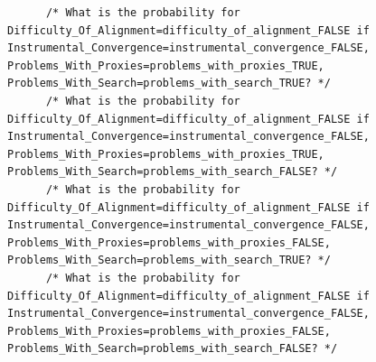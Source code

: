 \documentclass[
  11pt,
  letterpaper,
]{book}
\begin{document}
\begin{verbatim}
      /* What is the probability for Difficulty_Of_Alignment=difficulty_of_alignment_FALSE if Instrumental_Convergence=instrumental_convergence_FALSE, Problems_With_Proxies=problems_with_proxies_TRUE, Problems_With_Search=problems_with_search_TRUE? */
      /* What is the probability for Difficulty_Of_Alignment=difficulty_of_alignment_FALSE if Instrumental_Convergence=instrumental_convergence_FALSE, Problems_With_Proxies=problems_with_proxies_TRUE, Problems_With_Search=problems_with_search_FALSE? */
      /* What is the probability for Difficulty_Of_Alignment=difficulty_of_alignment_FALSE if Instrumental_Convergence=instrumental_convergence_FALSE, Problems_With_Proxies=problems_with_proxies_FALSE, Problems_With_Search=problems_with_search_TRUE? */
      /* What is the probability for Difficulty_Of_Alignment=difficulty_of_alignment_FALSE if Instrumental_Convergence=instrumental_convergence_FALSE, Problems_With_Proxies=problems_with_proxies_FALSE, Problems_With_Search=problems_with_search_FALSE? */

\end{verbatim}
\end{document}
